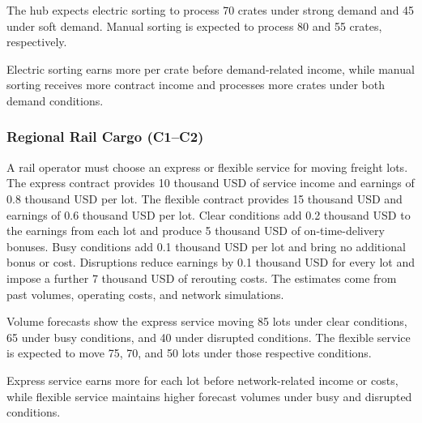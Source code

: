 	The hub expects electric sorting to process 70 crates under strong demand and 45 under soft demand. Manual sorting is expected to process 80 and 55 crates, respectively.
	
	Electric sorting earns more per crate before demand-related income, while manual sorting receives more contract income and processes more crates under both demand conditions.
	
	\subsubsection{Regional Rail Cargo (C1--C2)}
	\label{sec:problem35-regional-rail-cargo-c1-c2}
	
	A rail operator must choose an express or flexible service for moving freight lots. The express contract provides 10 thousand USD of service income and earnings of 0.8 thousand USD per lot. The flexible contract provides 15 thousand USD and earnings of 0.6 thousand USD per lot. Clear conditions add 0.2 thousand USD to the earnings from each lot and produce 5 thousand USD of on-time-delivery bonuses. Busy conditions add 0.1 thousand USD per lot and bring no additional bonus or cost. Disruptions reduce earnings by 0.1 thousand USD for every lot and impose a further 7 thousand USD of rerouting costs. The estimates come from past volumes, operating costs, and network simulations.
	
	Volume forecasts show the express service moving 85 lots under clear conditions, 65 under busy conditions, and 40 under disrupted conditions. The flexible service is expected to move 75, 70, and 50 lots under those respective conditions.
	
	Express service earns more for each lot before network-related income or costs, while flexible service maintains higher forecast volumes under busy and disrupted conditions.

	

